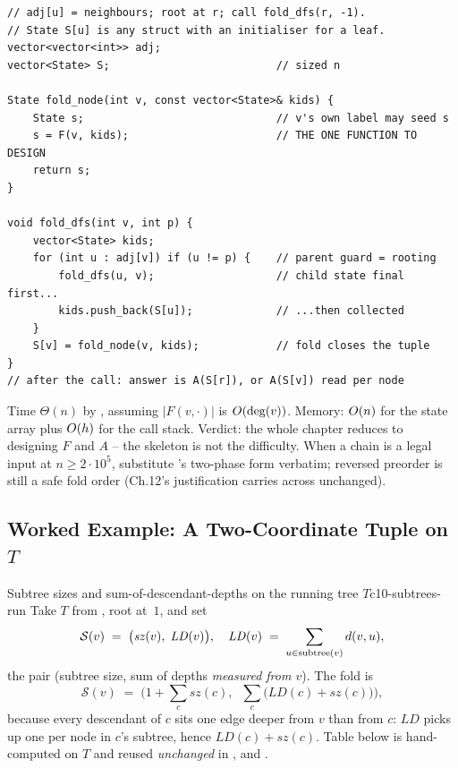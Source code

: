\begin{lstlisting}[caption={The generic child-fold on a general tree: same skeleton as \coderef{c09-dfs3}, arbitrary tuple payload}, label={lst:c10-fold}]
// adj[u] = neighbours; root at r; call fold_dfs(r, -1).
// State S[u] is any struct with an initialiser for a leaf.
vector<vector<int>> adj;
vector<State> S;                          // sized n

State fold_node(int v, const vector<State>& kids) {
    State s;                              // v's own label may seed s
    s = F(v, kids);                       // THE ONE FUNCTION TO DESIGN
    return s;
}

void fold_dfs(int v, int p) {
    vector<State> kids;
    for (int u : adj[v]) if (u != p) {    // parent guard = rooting
        fold_dfs(u, v);                   // child state final first...
        kids.push_back(S[u]);             // ...then collected
    }
    S[v] = fold_node(v, kids);            // fold closes the tuple
}
// after the call: answer is A(S[r]), or A(S[v]) read per node
\end{lstlisting}

\begin{complexitybox}
Time $\Theta(n)$ by , assuming $|F(v,\cdot)|$
is $O(\deg(v))$. Memory: $O(n)$ for the state array plus $O(h)$
for the call stack. Verdict: the whole chapter reduces to designing $F$ and
$A$ -- the skeleton is not the difficulty. When a chain is a legal input at
$n \ge 2\cdot 10^{5}$, substitute 's two-phase form
verbatim; reversed preorder is still a safe fold order (Ch.12's justification
carries across unchanged).
\end{complexitybox}

\subsection{Worked Example: A Two-Coordinate Tuple on $T$}

\begin{example}{Subtree sizes and sum-of-descendant-depths on the running tree $T$}{c10-subtrees-run}
Take $T$ from , root at~$1$, and set
\[
  \mathcal S(v) \;=\; \big(\mathit{sz}(v),\;\mathit{LD}(v)\big),\quad
  \mathit{LD}(v) \;=\; \sum_{u\in\operatorname{subtree}(v)} d(v,u),
\]
the pair (subtree size, sum of depths \emph{measured from $v$}). The fold is
\[
  \mathcal S(v) \;=\; \Big(1+\!\!\sum_{c}\!\mathit{sz}(c),\;\;\sum_{c}\!\big(\mathit{LD}(c)+\mathit{sz}(c)\big)\Big),
\]
because every descendant of $c$ sits one edge deeper from $v$ than from $c$:
$\mathit{LD}$ picks up one per node in $c$'s subtree, hence $\mathit{LD}(c)+\mathit{sz}(c)$.
Table below is hand-computed on $T$ and reused \emph{unchanged} in
,  and .
\end{example}

